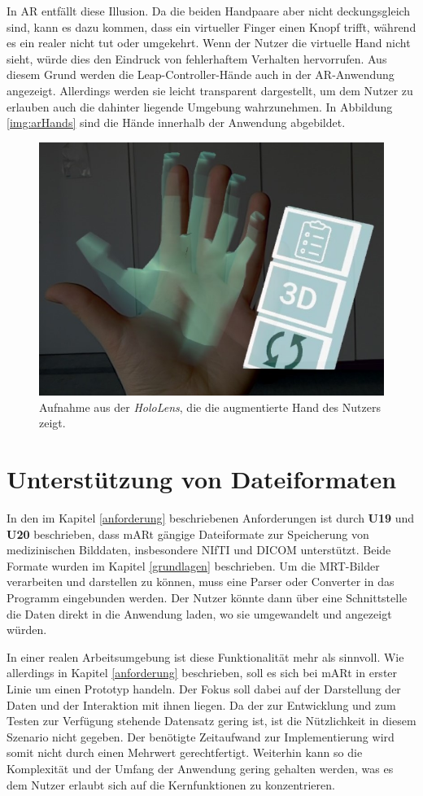 In AR entfällt diese Illusion. Da die beiden Handpaare aber nicht deckungsgleich sind, kann es dazu kommen, dass ein virtueller Finger einen Knopf trifft, während es ein realer nicht tut oder umgekehrt. Wenn der Nutzer die virtuelle Hand nicht sieht, würde dies den Eindruck von fehlerhaftem Verhalten hervorrufen. 
Aus diesem Grund werden die Leap-Controller-Hände auch in der AR-Anwendung angezeigt. Allerdings werden sie leicht transparent dargestellt, um dem Nutzer zu erlauben auch die dahinter liegende Umgebung wahrzunehmen. 
In Abbildung \ref{img:arHands} sind die Hände innerhalb der Anwendung abgebildet.

\begin{figure}[!htb]
	\centering
	\includegraphics[width=0.5\linewidth]{images/AR_hand.jpg}
	\caption{Aufnahme aus der \textit{HoloLens}, die die augmentierte Hand des Nutzers zeigt.}
	\label{img:handUI}
\end{figure}
\FloatBarrier


\section{Unterstützung von Dateiformaten} 

In den im Kapitel \ref{anforderung} beschriebenen Anforderungen ist durch \textbf{U19} und \textbf{U20} beschrieben, dass mARt gängige Dateiformate zur Speicherung von medizinischen Bilddaten, insbesondere NIfTI und DICOM unterstützt. Beide Formate wurden im Kapitel \ref{grundlagen} beschrieben. 
Um die MRT-Bilder verarbeiten und darstellen zu können, muss eine Parser oder Converter in das Programm eingebunden werden. 
Der Nutzer könnte dann über eine Schnittstelle die Daten direkt in die Anwendung laden, wo sie umgewandelt und angezeigt würden. 

In einer realen Arbeitsumgebung ist diese Funktionalität mehr als sinnvoll. Wie allerdings in Kapitel \ref{anforderung} beschrieben, soll es sich bei mARt in erster Linie um einen Prototyp handeln.
Der Fokus soll dabei auf der Darstellung der Daten und der Interaktion mit ihnen liegen. Da der zur Entwicklung und zum Testen zur Verfügung stehende Datensatz gering ist, ist die Nützlichkeit in diesem Szenario nicht gegeben. Der benötigte Zeitaufwand zur Implementierung wird somit nicht durch einen Mehrwert gerechtfertigt.
Weiterhin kann so die Komplexität und der Umfang der Anwendung gering gehalten werden, was es dem Nutzer erlaubt sich auf die Kernfunktionen zu konzentrieren. 

